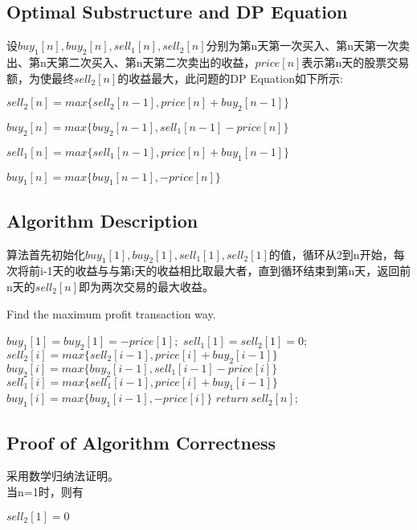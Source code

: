 \documentclass{article}
\begin{document}
\subsection{Optimal Substructure and DP Equation}

设$buy_1[n],buy_2[n],sell_1[n],sell_2[n]$分别为第n天第一次买入、第n天第一次卖出、第n天第二次买入、第n天第二次卖出的收益，$price[n]$表示第n天的股票交易额，为使最终$sell_2[n]$的收益最大，此问题的DP Equation如下所示:

\begin{center} 
$sell_2[n]=max\{sell_2[n-1], price[n]+buy_2[n-1]\}$

$buy_2[n]=max\{buy_2[n-1], sell_1[n-1]-price[n]\}$

$sell_1[n]=max\{sell_1[n-1], price[n]+buy_1[n-1]\}$

$buy_1[n]=max\{buy_1[n-1], -price[n]\}$
\end{center} 

\subsection{Algorithm Description}
算法首先初始化$buy_1[1],buy_2[1],sell_1[1],sell_2[1]$的值，循环从2到n开始，每次将前i-1天的收益与与第i天的收益相比取最大者，直到循环结束到第n天，返回前n天的$sell_2[n]$即为两次交易的最大收益。

\begin{algorithm}[htbp]   
  \caption{Find the maximum profit transaction way.}  
  \begin{algorithmic}[1] 
	\State $buy_1[1]=buy_2[1]=-price[1];$
	\State $ sell_1[1]=sell_2[1]=0$;
	\State $sell_2[i]=max\{sell_2[i-1], price[i]+buy_2[i-1]\}$
	\State $buy_2[i]=max\{buy_2[i-1], sell_1[i-1]-price[i]\}$
	\State $sell_1[i]=max\{sell_1[i-1], price[i]+buy_1[i-1]\}$
	\State $buy_1[i]=max\{buy_1[i-1], -price[i]\}$
     \EndFor
	\State $return\ sell_2[n]$;
    \EndFunction  
  \end{algorithmic}  
\end{algorithm} 


\subsection{Proof of Algorithm Correctness}
采用数学归纳法证明。
\\

当n=1时，则有

\begin{center} 
$sell_2[1]=0$
\end{center} 
\end{document}
